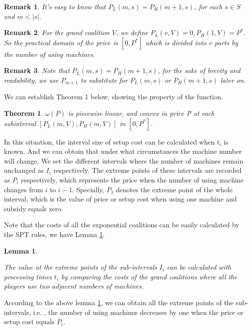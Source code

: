\documentclass[UTF8]{article}
\newtheorem{thm}{\hspace{2em}Theorem}
\newtheorem{lem}{\hspace{2em}Lemma}
\newtheorem{remark}{\hspace{2em}Remark}
\begin{document}
\begin{remark}
  It's easy to know that $P_L(m,s) = P_H(m+1,s)$, for each $s \in S$ and $ m <|s|$.
\end{remark}

\begin{remark}
  For the grand coalition $V$, we define $P_L(v,V) = 0, P_H(1,V) = P^*$. So the practical domain of the price is $[0,P^*]$ which is divided into $v$ parts by the number of using machines.
\end{remark}

\begin{remark}
  Note that $P_L(m,s) = P_H(m+1,s)$, for the sake of brevity and readability, we use $P_{m+1}$ to substitute for $P_L(m,s)$ or $P_H(m+1,s)$ later on.

\end{remark}

We can establish Theorem 1 below, showing the property of the function.

\begin{thm}\label{thm1}
$\omega(P)$ is piecewise linear, and convex in price P at each subinterval $[P_L(m,V),P_H(m,V)]$ in $[0,P^*] $.
\end{thm}


In this situation, the interval size of setup cost can be calculated when $t_i$ is known. And we can obtain that under what circumstances the machine number will change. We set the different intervals where the number of machines remain unchanged as $I_i$ respectively. The extreme points of these intervals are recorded as $P_i$ respectively, which represents the price when the number of using machine changes from $i$ to $i-1$. Specially, $P_1$ denotes the extreme point of the whole interval, which is the value of price or setup cost when using one machine and subsidy equals zero.

Note that the costs of all the exponential coalitions can be easily calculated by the SPT rules, we have Lemma \ref{lem1}.

\begin{lem}\label{lem1}

The value at the extreme points of the sub-intervals $I_i$ can be calculated with processing times $t_i$ by comparing the costs of the grand coalitions where all the players use two adjacent numbers of machines.
\end{lem}

According to the above lemma \ref{lem1}, we can obtain all the extreme points of the sub-intervals, i.e. , the number of using machines decreases by one when the price or setup cost equals $P_i$.
\end{document}
